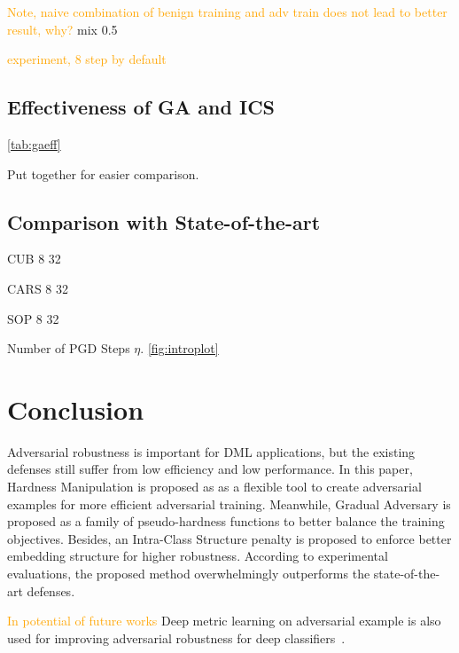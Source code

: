 \documentclass[10pt,twocolumn,letterpaper]{article}
\newcommand{\oo}[1]{\textcolor{orange}{#1}}
\begin{document}
\oo{Note, naive combination of benign training and adv train does not lead to better
result, why?} mix 0.5

\oo{experiment, 8 step by default}

\subsection{Effectiveness of GA and ICS}
\label{sec:43}



\cref{tab:gaeff}



Put together for easier comparison.

\subsection{Comparison with State-of-the-art}



CUB 8 32

CARS 8 32

SOP 8 32

Number of PGD Steps $\eta$.
\cref{fig:introplot}

\section{Conclusion}
\label{sec:5}

Adversarial robustness is important for DML applications, but
the existing defenses still suffer from low efficiency and low
performance.
%
In this paper, 
Hardness Manipulation is proposed as as a flexible tool to create
adversarial examples for more efficient adversarial training.
%
Meanwhile, Gradual Adversary is proposed as a family of pseudo-hardness
functions to better balance the training objectives.
%
Besides, an Intra-Class Structure penalty is proposed to enforce better
embedding structure for higher robustness.
%
According to experimental evaluations, the proposed method overwhelmingly
outperforms the state-of-the-art defenses.

\oo{In potential of future works}
Deep metric learning on adversarial example is also used for improving
adversarial robustness for deep classifiers~\cite{mao2019metric}.

{\small


}


\end{document}
